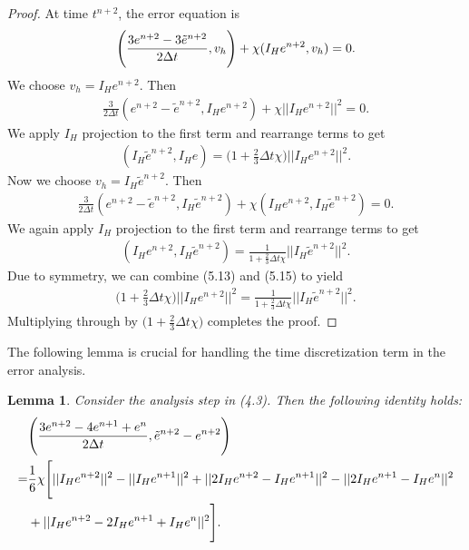 \documentclass[11pt,a4paper]{article}
\newtheorem{lemma}[theorem]{Lemma}
\begin{document}
\begin{proof}
    At time $t^{n+2}$, the error equation is
    \begin{align}
        \Bigg(\frac{3e^{n+2}-3\Tilde{e}^{n+2}}{2\Delta t},v_h\Bigg) +\chi (I_He^{n+2}, v_h)=0.
    \end{align}
    We choose $v_h=I_He^{n+2}$. Then
    \begin{align}
        \frac{3}{2\Delta t}(e^{n+2}-\tilde{e}^{n+2}, I_He^{n+2})+\chi||I_He^{n+2}||^2=0.
    \end{align}
    We apply $I_H$ projection to the first term and rearrange terms to get
    \begin{align}
        (I_H\tilde{e}^{n+2}, I_He)=\Bigg(1+\frac{2}{3}\Delta t\chi \Bigg)||I_He^{n+2}||^2.
    \end{align}
    Now we choose $v_h=I_H\tilde{e}^{n+2}$. Then
    \begin{align}
        \frac{3}{2\Delta t}(e^{n+2}-\tilde{e}^{n+2}, I_H\tilde{e}^{n+2})+\chi(I_He^{n+2}, I_H\tilde{e}^{n+2})=0.
    \end{align}
    We again apply $I_H$ projection to the first term and rearrange terms to get
    \begin{align}
        (I_He^{n+2}, I_H\tilde{e}^{n+2})=\frac{1}{1+\frac{2}{3}\Delta t \chi}||I_H\tilde{e}^{n+2}||^2.
    \end{align}
    Due to symmetry, we can combine (5.13) and (5.15) to yield
    \begin{align}
        \Bigg(1+\frac{2}{3}\Delta t \chi\Bigg)||I_He^{n+2}||^2=\frac{1}{1+\frac{2}{3}\Delta t\chi}||I_H\tilde{e}^{n+2}||^2.
    \end{align}
    Multiplying through by $\Bigg(1+\frac{2}{3}\Delta t\chi\Bigg)$ completes the proof.
\end{proof}

The following lemma is crucial for handling the time discretization term in the error analysis.

\begin{lemma}
    Consider the analysis step in (4.3). Then the following identity holds:
    \begin{align}
        &\Bigg(\frac{3e^{n+2}-4e^{n+1}+e^n}{2\Delta t}, \Tilde{e}^{n+2}-e^{n+2}\Bigg) \notag \\
        =&\frac{1}{6}\chi \Bigg[ ||I_He^{n+2}||^2-||I_He^{n+1}||^2 + ||2I_He^{n+2}-I_He^{n+1}||^2 - ||2I_He^{n+1}-I_He^n||^2 \\
        &+ ||I_He^{n+2}-2I_He^{n+1}+I_He^n||^2\Bigg]. \notag
    \end{align}
\end{lemma}
\end{document}
